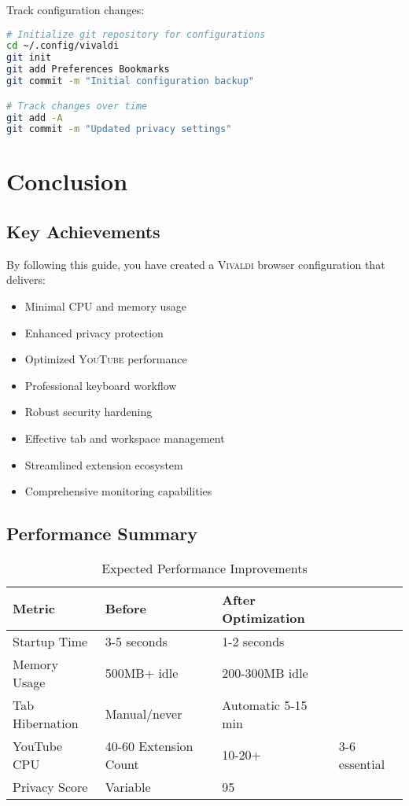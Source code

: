 \documentclass[11pt,a4paper,oneside]{book}
\newcommand{\vivaldi}{\textsc{Vivaldi}}
\newcommand{\youtube}{\textsc{YouTube}}
\begin{document}
Track configuration changes:

\begin{codebox}
\begin{lstlisting}[language=bash]
# Initialize git repository for configurations
cd ~/.config/vivaldi
git init
git add Preferences Bookmarks
git commit -m "Initial configuration backup"

# Track changes over time
git add -A
git commit -m "Updated privacy settings"
\end{lstlisting}
\end{codebox}

\chapter{Conclusion}

\section{Key Achievements}

By following this guide, you have created a \vivaldi{} browser configuration that delivers:

\begin{multicols}{2}
\begin{itemize}
    \item Minimal CPU and memory usage
    \item Enhanced privacy protection
    \item Optimized \youtube{} performance
    \item Professional keyboard workflow
    \item Robust security hardening
    \item Effective tab and workspace management
    \item Streamlined extension ecosystem
    \item Comprehensive monitoring capabilities
\end{itemize}
\end{multicols}

\section{Performance Summary}

\begin{table}[h]
\centering
\begin{tabular}{@{}lll@{}}
\toprule
\textbf{Metric} & \textbf{Before} & \textbf{After Optimization} \\
\midrule
Startup Time & 3-5 seconds & 1-2 seconds \\
Memory Usage & 500MB+ idle & 200-300MB idle \\
Tab Hibernation & Manual/never & Automatic 5-15 min \\
YouTube CPU & 40-60%
Extension Count & 10-20+ & 3-6 essential \\
Privacy Score & Variable & 95%
\bottomrule
\end{tabular}
\caption{Expected Performance Improvements}
\end{table}
\end{document}
